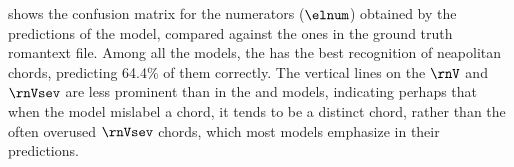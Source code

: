 

 shows the confusion
matrix for the numerators ($\elnum$) obtained by the
predictions of the \textcite{micchi2021deep} model, compared
against the ones in the ground truth \gls{romantext} file.
Among all the models, the \textcite{micchi2021deep} has the
best recognition of \gls{neapolitan} chords, predicting
64.4\% of them correctly. The vertical lines on the $\rnV$
and $\rnVsev$ are less prominent than in the
\textcite{chen2021attend} and \textcite{mcleod2021modular}
models, indicating perhaps that when the model mislabel a
chord, it tends to be a distinct chord, rather than the
often overused $\rnVsev$ chords, which most models emphasize
in their predictions.


